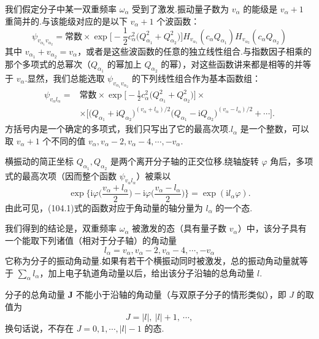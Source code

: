 我们假定分子中某一双重频率 $\omega_\alpha$ 受到了激发.振动量子数为 $v_\alpha$ 的能级是 $v_\alpha+1$ 重简并的.与该能级对应的是以下 $v_\alpha+1$ 个波函数：
\begin{equation*}
  \psi_{v_{\alpha_1}v_{\alpha_2}}=\text{常数}\times
  \exp\Big[-\frac{1}{2}c_\alpha^2\big(Q_{\alpha_1}^2+Q_{\alpha_2}^2\big)\Big]
  H_{v_{\alpha_1}}(c_\alpha Q_{\alpha_1})
  H_{v_{\alpha_2}}(c_\alpha Q_{\alpha_2})
\end{equation*}
其中 $v_{\alpha_1}+v_{\alpha_2}=v_\alpha$，或者是这些波函数的任意的独立线性组合.与指数因子相乘的那个多项式的总幂次（$Q_{\alpha_1}$ 的幂加上 $Q_{\alpha_2}$ 的幂），对这些函数讲来都是相等的并等于 $v_\alpha$.显然，我们总能选取 $\psi_{v_{\alpha_1}v_{\alpha_2}}$ 的下列线性组合作为基本函数组：
\begin{equation}
\begin{aligned}
  \psi_{v_\alpha l_\alpha}={}&\text{常数}\times
  \exp\Big[-\frac{1}{2}c_\alpha^2\big(Q_{\alpha_1}^2+Q_{\alpha_2}^2\big)\Big]\times\\
  &\times\Big[\big(Q_{\alpha_1}+\mathrm{i}Q_{\alpha_2}\big)^{(v_\alpha+l_\alpha)/2}
  \big(Q_{\alpha_1}-\mathrm{i}Q_{\alpha_2}\big)^{(v_\alpha-l_\alpha)/2}+\cdots\Big].
\end{aligned}
\end{equation}
方括号内是一个确定的多项式，我们只写出了它的最高次项.$l_\alpha$ 是一个整数，可以取 $v_\alpha+1$ 个不同的值 $v_\alpha,v_\alpha-2,v_\alpha-4,\cdots,-v_\alpha$.

横振动的简正坐标 $Q_{\alpha_1},Q_{\alpha_2}$ 是两个离开分子轴的正交位移.绕轴旋转 $\varphi$ 角后，多项式的最高次项（因而整个函数 $\psi_{v_\alpha l_\alpha}$）被乘以
\begin{equation*}
  \exp\Big\{\mathrm{i}\varphi\Big(\frac{v_\alpha+l_\alpha}{2}\Big)
  -\mathrm{i}\varphi\Big(\frac{v_\alpha-l_\alpha}{2}\Big)\Big\}
  =\exp(\mathrm{i}l_\alpha\varphi).
\end{equation*}
由此可见，(104.1)式的函数对应于角动量的轴分量为 $l_\alpha$ 的一个态.

我们得到的结论是，双重频率 $\omega_\alpha$ 被激发的态（具有量子数 $v_\alpha$）中，该分子具有一个能取下列诸值（相对于分子轴）的角动量
\begin{equation}
  l_\alpha=v_\alpha,v_\alpha-2,v_\alpha-4,\cdots,-v_\alpha
\end{equation}
它称为分子的振动角动量.如果有若干个横振动同时被激发，总的振动角动量就等于 $\sum\limits_\alpha l_\alpha$，加上电子轨道角动量以后，给出该分子沿轴的总角动量 $l$.

分子的总角动量 $\boldsymbol{J}$ 不能小于沿轴的角动量（与双原子分子的情形类似），即 $J$ 的取值为
\begin{equation*}
  J=|l|,\ |l|+1,\ \cdots,
\end{equation*}
换句话说，不存在 $J=0,1,\cdots,|l|-1$ 的态.

